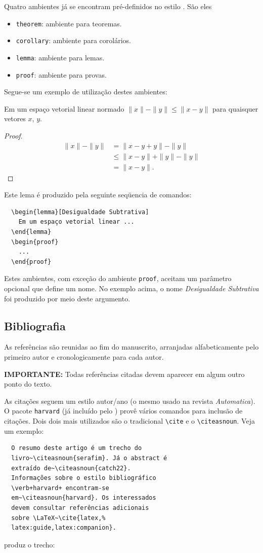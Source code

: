 \documentclass[conference,harvard,brazil,english]{sbatex}
\begin{document}
Quatro ambientes já se encontram pré-definidos no estilo \SBATeX. São
eles
\begin{itemize}
\item \verb+theorem+: ambiente para teoremas.
\item \verb+corollary+: ambiente para corolários.
\item \verb+lemma+: ambiente para lemas.
\item \verb+proof+: ambiente para provas.
\end{itemize}
Segue-se um exemplo de utilização destes ambientes:
\begin{lemma}
Em um espaço vetorial linear normado $\|x\| - \|y\| \leq \|x - y\|$
para quaisquer vetores $x$, $y$.
\end{lemma}
\begin{proof}
\begin{align*}
\|x\| - \|y\| &= \|x - y + y\| - \|y\| \ \\
              &\leq \|x - y \| + \|y\| - \|y\| \\
              &= \|x - y\|.
\end{align*}
\end{proof}
Este lema é produzido pela seguinte seqüencia de comandos:
\begin{verbatim}
  \begin{lemma}[Desigualdade Subtrativa]
    Em um espaço vetorial linear ...
  \end{lemma}
  \begin{proof}
    ...
  \end{proof}
\end{verbatim}

Estes ambientes, com exceção do ambiente \verb+proof+, aceitam
um parâmetro opcional que define um nome. No exemplo acima, o nome
\emph{Desigualdade Subtrativa} foi produzido por meio deste argumento.


\subsection{Bibliografia}
\label{sec:bibliografia}

As referências são reunidas ao fim do manuscrito, arranjadas
alfabeticamente pelo primeiro autor e cronologicamente para cada
autor.

\textbf{IMPORTANTE:} Todas referências citadas devem aparecer em algum
outro ponto do texto.

As citações seguem um estilo autor/ano (o mesmo
usado na revista {\em Automatica}). O pacote \verb+harvard+ (já
incluído pelo \SBATeX) provê vários comandos para inclusão de
citações. Dois dois mais utilizados são o tradicional \verb+\cite+ e o
\verb+\citeasnoun+. Veja um exemplo:
\begin{verbatim}
  O resumo deste artigo é um trecho do
  livro~\citeasnoun{serafim}. Já o abstract é
  extraído de~\citeasnoun{catch22}.
  Informações sobre o estilo bibliográfico
  \verb+harvard+ encontram-se
  em~\citeasnoun{harvard}. Os interessados
  devem consultar referências adicionais
  sobre \LaTeX~\cite{latex,%
  latex:guide,latex:companion}.
\end{verbatim}
produz o trecho:
\end{document}
